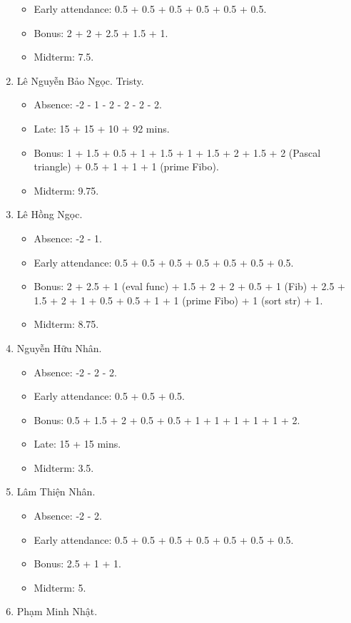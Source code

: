 \documentclass{article}
\begin{document}
\begin{enumerate}
\begin{itemize}
		\item Early attendance: 0.5 + 0.5 + 0.5 + 0.5 + 0.5 + 0.5.
		\item Bonus: 2 + 2 + 2.5 + 1.5 + 1.
        \item Midterm: 7.5.
	\end{itemize}
	\item {\sc Lê Nguyễn Bảo Ngọc.} Tristy.
	\begin{itemize}
		\item Absence: -2 - 1 - 2 - 2 - 2 - 2.
		\item Late: 15 + 15 + 10 + 92 mins.
		\item Bonus: 1 + 1.5 + 0.5 + 1 + 1.5 + 1 + 1.5 + 2 + 1.5 + 2 (Pascal triangle) + 0.5 + 1 + 1 + 1 (prime Fibo).
        \item Midterm: 9.75.
	\end{itemize}
	\item {\sc Lê Hồng Ngọc.}
	\begin{itemize}
		\item Absence: -2 - 1.
		\item Early attendance: 0.5 + 0.5 + 0.5 + 0.5 + 0.5 + 0.5 + 0.5.
		\item Bonus: 2 + 2.5 + 1 (eval func) + 1.5 + 2 + 2 + 0.5 + 1 (Fib) + 2.5 + 1.5 + 2 + 1 + 0.5 + 0.5 + 1 + 1 (prime Fibo) + 1 (sort str) + 1.
        \item Midterm: 8.75.
	\end{itemize}
	\item {\sc Nguyễn Hữu Nhân.}
	\begin{itemize}
		\item Absence: -2 - 2 - 2.
		\item Early attendance: 0.5 + 0.5 + 0.5.
		\item Bonus: 0.5 + 1.5 + 2 + 0.5 + 0.5 + 1 + 1 + 1 + 1 + 1 + 2.
		\item Late: 15 + 15 mins.
        \item Midterm: 3.5.
	\end{itemize}
	\item {\sc Lâm Thiện Nhân.}
	\begin{itemize}
		\item Absence: -2 - 2.
		\item Early attendance: 0.5 + 0.5 + 0.5 + 0.5 + 0.5 + 0.5 + 0.5.
		\item Bonus: 2.5 + 1 + 1.
        \item Midterm: 5.
	\end{itemize}
	\item {\sc Phạm Minh Nhật.}

\end{enumerate}
\end{document}
